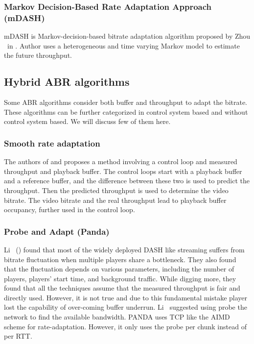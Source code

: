 \subsubsection{Markov Decision-Based Rate Adaptation Approach (mDASH)}
mDASH is Markov-decision-based bitrate adaptation algorithm proposed by Zhou \etal\ in \cite{7393865}. Author uses a heterogeneous and time varying Markov model to estimate the future throughput.

\subsection{Hybrid ABR algorithms}
Some ABR algorithms consider both buffer and throughput to adapt the bitrate. These algorithms can be further categorized in control system based and without control system based. We will discuss few of them here.

\subsubsection{Smooth rate adaptation}
The authors of \cite{10.1145/2413176.2413190} and \cite{6694183} proposes a method involving a control loop and measured throughput and playback buffer. The control loops start with a playback buffer and a reference buffer, and the difference between these two is used to predict the throughput. Then the predicted throughput is used to determine the video bitrate. The video bitrate and the real throughput lead to playback buffer occupancy, further used in the control loop.

\subsubsection{Probe and Adapt (Panda)}
Li \etal\ (\cite{140405}) found that most of the widely deployed DASH like streaming suffers from bitrate fluctuation when multiple players share a bottleneck. They also found that the fluctuation depends on various parameters, including the number of players, players' start time, and background traffic. While digging more, they found that all the techniques assume that the measured throughput is fair and directly used. However, it is not true and due to this fundamental mistake player lost the capability of over-coming buffer underrun. Li \etal\ suggested using probe the network to find the available bandwidth. PANDA uses TCP like the AIMD scheme for rate-adaptation. However, it only uses the probe per chunk instead of per RTT.

